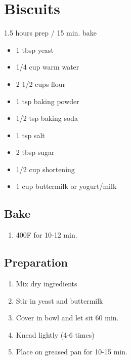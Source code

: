 \documentclass[12pt]{article}
\begin{document}
\section*{Biscuits}

1.5 hours prep / 15 min. bake

\begin{itemize}
\item 1 tbsp yeast
\item 1/4 cup warm water
\item 2 1/2 cups flour
\item 1 tsp baking powder
\item 1/2 tsp baking soda
\item 1 tsp salt
\item 2 tbsp sugar
\item 1/2 cup shortening
\item 1 cup buttermilk or yogurt/milk
\end{itemize}

\subsection*{Bake}

\begin{enumerate}
\item 400F for 10-12 min.
\end{enumerate}

\subsection*{Preparation}

\begin{enumerate}
\item Mix dry ingredients
\item Stir in yeast and buttermilk
\item Cover in bowl and let sit 60 min.
\item Knead lightly (4-6 times)
\item Place on greased pan for 10-15 min.
\end{enumerate}
\end{document}
